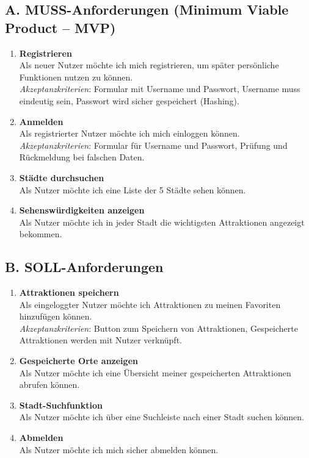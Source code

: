 \documentclass[a4paper,12pt]{article}
\begin{document}
    \subsection*{A. MUSS-Anforderungen (Minimum Viable Product – MVP)}
    \begin{enumerate}
        \item \textbf{Registrieren} \\
        Als neuer Nutzer möchte ich mich registrieren, um später persönliche Funktionen nutzen zu können. \\
        \textit{Akzeptanzkriterien}: Formular mit Username und Passwort, Username muss eindeutig sein, Passwort wird sicher gespeichert (Hashing).

        \item \textbf{Anmelden} \\
        Als registrierter Nutzer möchte ich mich einloggen können. \\
        \textit{Akzeptanzkriterien}: Formular für Username und Passwort, Prüfung und Rückmeldung bei falschen Daten.

        \item \textbf{Städte durchsuchen} \\
        Als Nutzer möchte ich eine Liste der 5 Städte sehen können.

        \item \textbf{Sehenswürdigkeiten anzeigen} \\
        Als Nutzer möchte ich in jeder Stadt die wichtigsten Attraktionen angezeigt bekommen.
    \end{enumerate}

    \subsection*{B. SOLL-Anforderungen}
    \begin{enumerate}
        \item \textbf{Attraktionen speichern} \\
        Als eingeloggter Nutzer möchte ich Attraktionen zu meinen Favoriten hinzufügen können. \\
        \textit{Akzeptanzkriterien}: Button zum Speichern von Attraktionen, Gespeicherte Attraktionen werden mit Nutzer verknüpft.

        \item \textbf{Gespeicherte Orte anzeigen} \\
        Als Nutzer möchte ich eine Übersicht meiner gespeicherten Attraktionen abrufen können.

        \item \textbf{Stadt-Suchfunktion} \\
        Als Nutzer möchte ich über eine Suchleiste nach einer Stadt suchen können.

        \item \textbf{Abmelden} \\
        Als Nutzer möchte ich mich sicher abmelden können.
    \end{enumerate}
\end{document}

